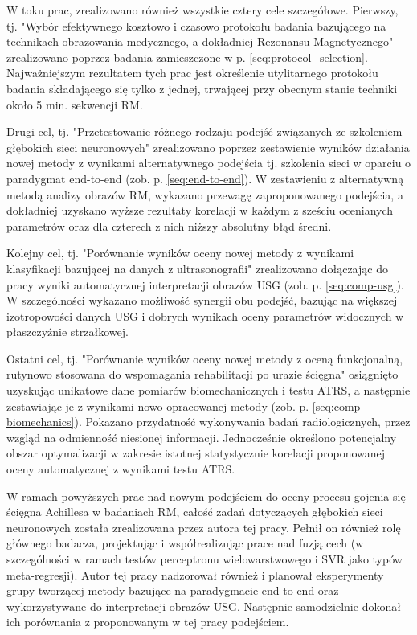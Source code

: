 W toku prac, zrealizowano również wszystkie cztery cele szczegółowe. Pierwszy, tj. "Wybór efektywnego kosztowo i czasowo protokołu badania bazującego \linebreak na technikach obrazowania medycznego, a dokładniej Rezonansu Magnetycznego" zrealizowano poprzez badania zamieszczone w p. \ref{seq:protocol_selection}. Najważniejszym rezultatem tych prac jest określenie utylitarnego protokołu badania składającego się tylko \linebreak z jednej, trwającej przy obecnym stanie techniki około 5 min. sekwencji RM. 

Drugi cel, tj. "Przetestowanie różnego rodzaju podejść związanych ze szkoleniem głębokich sieci neuronowych" zrealizowano poprzez zestawienie wyników działania nowej metody z wynikami alternatywnego podejścia tj. szkolenia sieci w oparciu \linebreak o paradygmat end-to-end (zob. p. \ref{seq:end-to-end}). W zestawieniu z alternatywną metodą analizy obrazów RM, wykazano przewagę zaproponowanego podejścia, a dokładniej uzyskano wyższe rezultaty korelacji w każdym z sześciu ocenianych parametrów oraz dla czterech z nich niższy absolutny błąd średni.

Kolejny cel, tj. "Porównanie wyników oceny nowej metody z wynikami klasyfikacji bazującej na danych z ultrasonografii" zrealizowano dołączając do pracy wyniki automatycznej interpretacji obrazów USG (zob. p. \ref{seq:comp-usg}). W szczególności wykazano możliwość synergii obu podejść, bazując na większej izotropowości danych USG \linebreak i dobrych wynikach oceny parametrów widocznych w płaszczyźnie strzałkowej.

Ostatni cel, tj. "Porównanie wyników oceny nowej metody z oceną funkcjonalną, rutynowo stosowana do wspomagania rehabilitacji po urazie ścięgna" osiągnięto uzyskując unikatowe dane pomiarów biomechanicznych i testu ATRS, a następnie zestawiając je z wynikami nowo-opracowanej metody (zob. p. \ref{seq:comp-biomechanics}). Pokazano przydatność wykonywania badań radiologicznych, przez wzgląd na odmienność niesionej informacji. Jednocześnie określono potencjalny obszar optymalizacji w zakresie istotnej statystycznie korelacji proponowanej oceny automatycznej z wynikami testu ATRS.  

W ramach powyższych prac nad nowym podejściem do oceny procesu gojenia się ścięgna Achillesa w badaniach RM, całość zadań dotyczących głębokich sieci neuronowych została zrealizowana przez autora tej pracy. Pełnił on również rolę głównego badacza, projektując i współrealizując prace nad fuzją cech (w szczególności w ramach testów perceptronu wielowarstwowego i SVR jako typów meta-regresji). Autor tej pracy nadzorował również i planował eksperymenty grupy tworzącej metody bazujące na paradygmacie end-to-end oraz wykorzystywane do interpretacji obrazów USG. Następnie samodzielnie dokonał ich porównania z proponowanym w tej pracy podejściem. 

